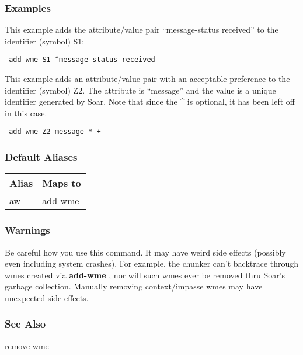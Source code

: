 \subsubsection*{Examples}
 This example adds the attribute/value pair ``message-status received'' to the identifier (symbol) S1: \begin{verbatim}
 add-wme S1 ^message-status received
\end{verbatim}
 This example adds an attribute/value pair with an acceptable preference to the identifier (symbol) Z2. The attribute is ``message'' and the value is a unique identifier generated by Soar. Note that since the \^{} is optional, it has been left off in this case. \begin{verbatim}
 add-wme Z2 message * + 
\end{verbatim}
\subsubsection*{Default Aliases}
\begin{tabular}{|l|l|}
\hline 
 Alias  & Maps to  \\
 \hline 
 aw  & add-wme  \\
 \hline 
\end{tabular}
\subsubsection*{Warnings}
 Be careful how you use this command. It may have weird side effects (possibly even including system crashes). For example, the chunker can't backtrace through wmes created via \textbf{add-wme}
, nor will such wmes ever be removed thru Soar's garbage collection. Manually removing context/impasse wmes may have unexpected side effects. 
\subsubsection*{See Also}
\hyperref[remove-wme]{remove-wme} 